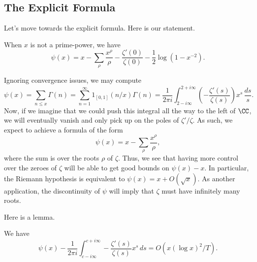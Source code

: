 \documentclass[../notes.tex]{subfiles}
\begin{document}
\subsection{The Explicit Formula}
Let's move towards the explicit formula. Here is our statement.
\begin{theorem}
	When $x$ is not a prime-power, we have
	\[\psi(x)=x-\sum_\rho\frac{x^\rho}\rho-\frac{\zeta'(0)}{\zeta(0)}-\frac12\log\left(1-x^{-2}\right).\]
\end{theorem}
\begin{remark}
	Ignoring convergence issues, we may compute
	\[\psi(x)=\sum_{n\le x}\Gamma(n)=\sum_{n=1}^\infty1_{[0,1]}(n/x)\Gamma(n)=\frac1{2\pi i}\int_{2-i\infty}^{2+i\infty}\left(-\frac{\zeta'(s)}{\zeta(s)}\right)x^s\,\frac{ds}s.\]
	Now, if we imagine that we could push this integral all the way to the left of $\CC$, we will eventually vanish and only pick up on the poles of $\zeta'/\zeta$. As such, we expect to achieve a formula of the form
	\[\psi(x)=x-\sum_\rho\frac{x^\rho}\rho,\]
	where the sum is over the roots $\rho$ of $\zeta$. Thus, we see that having more control over the zeroes of $\zeta$ will be able to get good bounds on $\psi(x)-x$. In particular, the Riemann hypothesis is equivalent to $\psi(x)=x+O(\sqrt x)$. As another application, the discontinuity of $\psi$ will imply that $\zeta$ must have infinitely many roots.
\end{remark}
Here is a lemma.
\begin{lemma}
	We have
	\[\psi(x)-\frac1{2\pi i}\int_{c-i\infty}^{c+i\infty}-\frac{\zeta'(s)}{\zeta(s)}x^s\,ds=O\left(x(\log x)^2/T\right).\]
\end{lemma}
\end{document}
